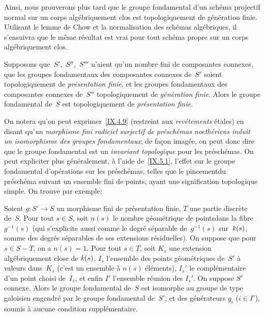 Ainsi,
nous prouverons plus tard que le groupe fondamental d'un sch\'ema
projectif normal sur un corps alg\'ebriquement clos est
topologiquement de g\'en\'eration finie. Utilisant le lemme de
Chow et la normalisation des sch\'emas alg\'ebriques, il
s'ensuivra que le m\^eme r\'esultat est vrai pour tout sch\'ema
propre sur un corps alg\'ebriquement clos.

\begin{corollaire}
\label{IX.5.3}
Supposons que~$S'$,~$S''$,~$S'''$ n'aient qu'un nombre fini de
composantes connexes, que les groupes fondamentaux des composantes
connexes de~$S'$ soient topologiquement de \emph{présentation
finie}, et les groupes fondamentaux des composantes connexes de~$S''$
topologiquement de \emph{génération finie}. Alors le groupe
fondamental de~$S$ est topologiquement de \emph{présentation
finie}.
\end{corollaire}

On notera qu'on peut exprimer~\ref{IX.4.9} (restreint aux
\emph{revêtements} \'etales) en disant qu'\emph{un morphisme
fini radiciel surjectif de préschémas noethériens induit
un isomorphisme des groupes fondamentaux}; de fa\c con imag\'ee,
on peut donc dire que le groupe fondamental est un \emph{invariant
topologique} pour les pr\'esch\'emas. On peut expliciter plus
g\'en\'eralement, \`a l'aide de~\ref{IX.5.1}, l'effet sur le
groupe fondamental d'op\'erations sur les pr\'esch\'emas, telles
que le \og pincement\fg du pr\'esch\'ema suivant un ensemble fini de
points, ayant une signification topologique simple. On trouve par
exemple:

\begin{corollaire}
\label{IX.5.4}
Soient $g\colon S'\to S$ un morphisme fini de pr\'esentation finie,
$T$ une partie discr\`ete de~$S$. Pour tout $s\in S$, soit $n(s)$ le
\og nombre g\'eom\'etrique de points\fg dans la fibre $g^{-1}(s)$
(qui s'explicite aussi comme le degr\'e s\'eparable de~$g^{-1}(s)$
sur~$\mathit{k}(s)$, somme des degr\'es s\'eparables de ses extensions
r\'esiduelles). On suppose que pour $s\in S-T$, on a $n(s)=1$. Pour
tout $s\in T$, soit $K_s$ une extension alg\'ebriquement close de
$\mathit{k}(s)$, $I_s$ l'ensemble des points g\'eom\'etriques de~$S'$ \`a
valeurs dans~$K_s$ (c'est un ensemble \`a $n(s)$ \'el\'ements),
$I_s'$ le compl\'ementaire d'un point choisi de~$I_s$, et enfin $I'$
l'ensemble r\'eunion des $I_s'$. On suppose $S'$ connexe. Alors le
groupe fondamental de~$S$ est isomorphe au groupe de type galoisien
engendr\'e par le groupe fondamental de~$S'$, et des
g\'en\'erateurs $g_i$ ($i\in I'$), soumis \`a aucune condition
suppl\'ementaire.
\end{corollaire}


